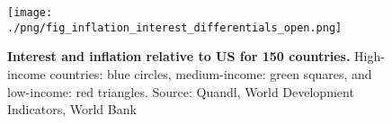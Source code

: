 \begin{figure}[h]
\caption{\label{fig:inflation_interest_differentials_open} \textbf{Interest and inflation relative to US for 150 countries.} High-income countries: blue circles, medium-income: green squares, and low-income: red triangles. {\tiny Source: Quandl, World Development Indicators, World Bank}}
\hspace*{-.5cm}\texttt{[image: ./png/fig\_inflation\_interest\_differentials\_open.png]}
\end{figure}